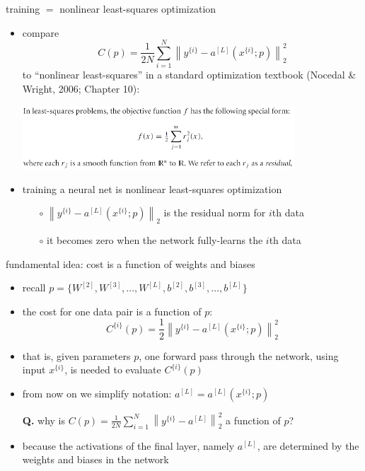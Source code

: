 \documentclass[xcolor={svgnames},
               hyperref={colorlinks,citecolor=DeepPink4,linkcolor=FireBrick,urlcolor=Maroon}]
               {beamer}
\begin{document}
\begin{frame}{training $=$ nonlinear least-squares optimization}

\begin{itemize}
\item compare
    $$C(p) = \frac{1}{2N} \sum_{i=1}^N \left\|y^{\{i\}} - a^{[L]}(x^{\{i\}}; p)\right\|_2^2$$
to ``nonlinear least-squares'' in a standard optimization textbook (Nocedal \& Wright, 2006; Chapter 10):

\medskip
\quad \includegraphics[width=0.8\textwidth]{figs/nls}

\medskip
\item training a neural net is \alert{nonlinear least-squares optimization}
    \begin{itemize}
    \item[$\circ$] $\left\|y^{\{i\}} - a^{[L]}(x^{\{i\}}; p)\right\|_2$ is the \alert{residual norm} for $i$th data
    \item[$\circ$] it becomes zero when the network fully-learns the $i$th data
    \end{itemize}
\end{itemize}
\end{frame}


\begin{frame}{fundamental idea: cost is a function of weights and biases}

\begin{itemize}
\item recall $p = \{W^{[2]},W^{[3]},\dots,W^{[L]},b^{[2]},b^{[3]},\dots,b^{[L]}\}$
\item the \alert{cost} for one data pair \alert{is a function of} $p$:
    $$C^{\{i\}}(p) = \frac{1}{2} \left\|y^{\{i\}} - a^{[L]}(x^{\{i\}}; p)\right\|_2^2$$
\item that is, given parameters $p$, one forward pass through the network, using input $x^{\{i\}}$, is needed to evaluate $C^{\{i\}}(p)$
\item from now on we simplify notation: \quad $\displaystyle a^{[L]} = a^{[L]}(x^{\{i\}}; p)$

\bigskip\bigskip
\item[\textbf{Q.}] why is $C(p) = \frac{1}{2N} \sum_{i=1}^N \left\|y^{\{i\}} - a^{[L]}\right\|_2^2$ a function of $p$?
\item<2>[\textbf{a.}] because the activations of the final layer, namely $a^{[L]}$, are determined by the weights and biases in the network
\end{itemize}
\end{frame}
\end{document}

